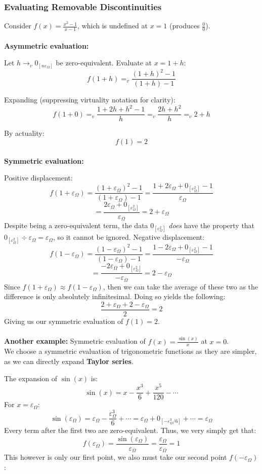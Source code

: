 \documentclass{article}
\begin{document}
\subsubsection{Evaluating Removable Discontinuities}

Consider $f(x) = \frac{x^2 - 1}{x - 1}$, which is undefined at $x = 1$ (produces $\frac{0}{0}$).\\\\\textbf{Asymmetric evaluation:}

Let $h \to_v 0_{[n\varepsilon_\Omega]}$ be zero-equivalent. Evaluate at $x = 1 + h$:
$$f(1 + h) =_v \frac{(1 + h)^2 - 1}{(1 + h) - 1}$$

Expanding (suppressing virtuality notation for clarity):
$$f(1 + 0) =_v \frac{1 + 2h + h^2 - 1}{h} =_v \frac{2h + h^2}{h} =_v 2 + h$$

By actuality:
$$f(1) = 2$$\\\textbf{Symmetric evaluation:}

Positive displacement:
$$f(1 + \varepsilon_\Omega) = \frac{(1 + \varepsilon_\Omega)^2 - 1}{(1 + \varepsilon_\Omega) - 1} = \frac{1 + 2\varepsilon_\Omega + 0_{[\varepsilon_\Omega^2]} - 1}{\varepsilon_\Omega}$$
$$= \frac{2\varepsilon_\Omega + 0_{[\varepsilon_\Omega^2]}}{\varepsilon_\Omega} = 2+\varepsilon_\Omega$$Despite being a zero-equivalent term, the data $0_{[\varepsilon_\Omega^2]}$ \textit{does} have the property that $0_{[\varepsilon_\Omega^2]}\div{\varepsilon_\Omega}=\varepsilon_\Omega$, so it cannot be ignored.
Negative displacement:
$$f(1 - \varepsilon_\Omega) = \frac{(1 - \varepsilon_\Omega)^2 - 1}{(1 - \varepsilon_\Omega) - 1} = \frac{1 - 2\varepsilon_\Omega + 0_{[\varepsilon_\Omega^2]} - 1}{-\varepsilon_\Omega}$$
$$= \frac{-2\varepsilon_\Omega + 0_{[\varepsilon_\Omega^2]}}{-\varepsilon_\Omega} = 2-\varepsilon_\Omega$$Since $f(1 + \varepsilon_\Omega) \approx f(1 - \varepsilon_\Omega)$, then we can take the average of these two as the difference is only absolutely infinitesimal. Doing so yields the following:
$$\frac{2 +\varepsilon_\Omega+ 2-\varepsilon_\Omega}{2} = 2$$Giving us our symmetric evaluation of $f(1) = 2$.\\\\\textbf{Another example:} Symmetric evaluation of $f(x) = \frac{\sin(x)}{x}$ at $x = 0$.\\We choose a symmetric evaluation of trigonometric functions as they are simpler, as we can directly expand \textbf{Taylor series}.

The expansion of $\sin(x)$ is:
$$\sin(x) = x - \frac{x^3}{6} + \frac{x^5}{120} - \cdots$$For $x = \varepsilon_\Omega$:
$$\sin(\varepsilon_\Omega) = \varepsilon_\Omega - \frac{\varepsilon_\Omega^3}{6} + \cdots = \varepsilon_\Omega + 0_{[-\varepsilon_\Omega^3/6]} +\cdots= \varepsilon_\Omega$$Every term after the first two are zero-equivalent.
Thus, we very simply get that:
$$f(\varepsilon_\Omega) = \frac{\sin(\varepsilon_\Omega)}{\varepsilon_\Omega}=\frac{\varepsilon_\Omega}{\varepsilon_\Omega} = 1$$This however is only our first point, we also must take our second point $f(-\varepsilon_\Omega)$:
\end{document}
